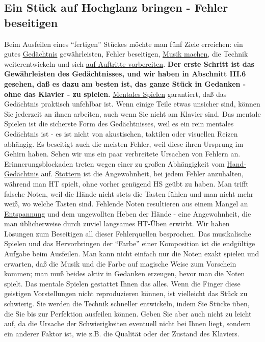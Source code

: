 
\subsection{Ein Stück auf Hochglanz bringen - Fehler beseitigen}
\label{c1iii9}

Beim Ausfeilen eines \enquote{fertigen} Stückes möchte man fünf Ziele erreichen: ein gutes \hyperref[c1iii6]{Gedächtnis} gewährleisten, Fehler beseitigen, \hyperref[c1iii14d]{Musik machen}, die Technik weiterentwickeln und sich \hyperref[c1iii14]{auf Auftritte vorbereiten}.
\textbf{Der erste Schritt ist das Gewährleisten des Gedächtnisses, und wir haben in Abschnitt III.6 gesehen, daß es dazu am besten ist, das ganze Stück in Gedanken - ohne das Klavier - zu spielen.}
\hyperref[c1ii12]{Mentales Spielen} garantiert, daß das Gedächtnis praktisch unfehlbar ist.
Wenn einige Teile etwas unsicher sind, können Sie jederzeit an ihnen arbeiten, auch wenn Sie nicht am Klavier sind.
Das mentale Spielen ist die sicherste Form des Gedächtnisses, weil es ein rein mentales Gedächtnis ist - es ist nicht von akustischen, taktilen oder visuellen Reizen abhängig.
Es beseitigt auch die meisten Fehler, weil diese ihren Ursprung im Gehirn haben.
Sehen wir uns ein paar verbreitete Ursachen von Fehlern an.
Erinnerungsblockaden treten wegen einer zu großen Abhängigkeit vom \hyperref[c1iii6hand]{Hand-Gedächtnis} auf.
\hyperref[c1ii22]{Stottern} ist die Angewohnheit, bei jedem Fehler anzuhalten, während man HT spielt, ohne vorher genügend HS geübt zu haben.
Man trifft falsche Noten, weil die Hände nicht stets die Tasten fühlen und man nicht mehr weiß, wo welche Tasten sind.
Fehlende Noten resultieren aus einem Mangel an \hyperref[c1ii14]{Entspannung} und dem ungewollten Heben der Hände - eine Angewohnheit, die man üblicherweise durch zuviel langsames HT-Üben erwirbt.
Wir haben Lösungen  zum Beseitigen all dieser Fehlerquellen besprochen.
Das musikalische Spielen und das Hervorbringen der \enquote{Farbe} einer Komposition ist die endgültige Aufgabe beim Ausfeilen.
Man kann nicht einfach nur die Noten exakt spielen und erwarten, daß die Musik und die Farbe auf magische Weise zum Vorschein kommen; man muß beides aktiv in Gedanken erzeugen, bevor man die Noten spielt.
Das mentale Spielen gestattet Ihnen das alles.
Wenn die Finger diese geistigen Vorstellungen nicht reproduzieren können, ist vielleicht das Stück zu schwierig.
Sie werden die Technik schneller entwickeln, indem Sie Stücke üben, die Sie bis zur Perfektion ausfeilen können.
Geben Sie aber auch nicht zu leicht auf, da die Ursache der Schwierigkeiten eventuell nicht bei Ihnen liegt, sondern ein anderer Faktor ist, wie z.B. die Qualität oder der Zustand des Klaviers.

